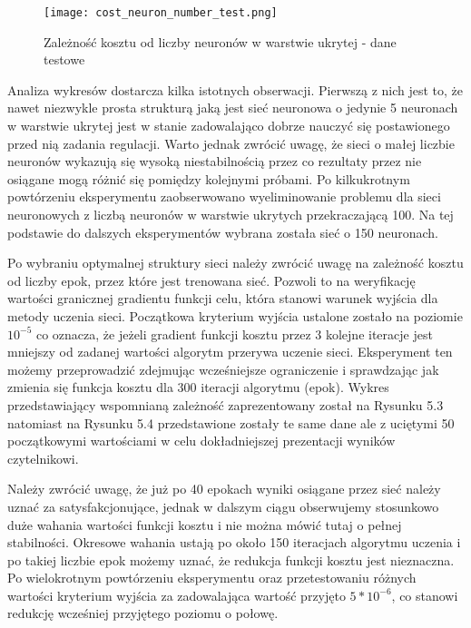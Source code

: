 \begin{figure}[h]
  \label{fig:Koszt-liczba-neuronow-testowe}
  \centering \texttt{[image: cost\_neuron\_number\_test.png]}
  \caption{Zależność kosztu od liczby neuronów w warstwie ukrytej - dane testowe}
\end{figure}

\par Analiza wykresów dostarcza kilka istotnych obserwacji. Pierwszą z nich jest to, że nawet niezwykle prosta strukturą jaką jest sieć neuronowa o jedynie 5 neuronach w warstwie ukrytej jest w stanie zadowalająco dobrze nauczyć się postawionego przed nią zadania regulacji. Warto jednak zwrócić uwagę, że sieci o małej liczbie neuronów wykazują się wysoką niestabilnością przez co rezultaty przez nie osiągane mogą różnić się pomiędzy kolejnymi próbami. Po kilkukrotnym powtórzeniu eksperymentu zaobserwowano wyeliminowanie problemu dla sieci neuronowych z liczbą neuronów w warstwie ukrytych przekraczającą 100. Na tej podstawie do dalszych eksperymentów wybrana została sieć o 150 neuronach. 
\par Po wybraniu optymalnej struktury sieci należy zwrócić uwagę na zależność kosztu od liczby epok, przez które jest trenowana sieć. Pozwoli to na weryfikację wartości granicznej gradientu funkcji celu, która stanowi warunek wyjścia dla metody uczenia sieci. Początkowa kryterium wyjścia ustalone zostało na poziomie \( 10^{-5} \) co oznacza, że jeżeli gradient funkcji kosztu przez 3 kolejne iteracje jest mniejszy od zadanej wartości algorytm przerywa uczenie sieci. Eksperyment ten możemy przeprowadzić zdejmując wcześniejsze ograniczenie i sprawdzając jak zmienia się funkcja kosztu dla 300 iteracji algorytmu (epok). Wykres przedstawiający wspomnianą zależność zaprezentowany został na Rysunku 5.3 natomiast na Rysunku 5.4 przedstawione zostały te same dane ale z uciętymi 50 początkowymi wartościami w celu dokładniejszej prezentacji wyników czytelnikowi.
\par Należy zwrócić uwagę, że już po 40 epokach wyniki osiągane przez sieć należy uznać za satysfakcjonujące, jednak w dalszym ciągu obserwujemy stosunkowo duże wahania wartości funkcji kosztu i nie można mówić tutaj o pełnej stabilności. Okresowe wahania ustają po około 150 iteracjach algorytmu uczenia i po takiej liczbie epok możemy uznać, że redukcja funkcji kosztu jest nieznaczna. Po wielokrotnym powtórzeniu eksperymentu oraz przetestowaniu różnych wartości kryterium wyjścia za zadowalająca wartość przyjęto \( 5*10^{-6} \), co stanowi redukcję wcześniej przyjętego poziomu o połowę.

